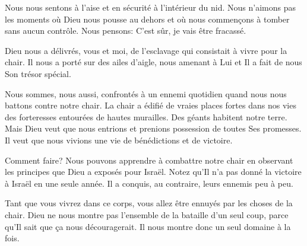 Nous nous sentons à l'aise et en sécurité à l'intérieur du nid.
 Nous n'aimons pas les moments où Dieu nous pousse au dehors
 et où nous commençons à tomber sans aucun contrôle.
 Nous pensons: \og C'est sûr, je vais être fracassé. \fg{}


Dieu nous a délivrés, vous et moi, de l'esclavage
 qui consistait à vivre pour la chair.
 Il nous a porté sur des ailes d'aigle, nous amenant à Lui
 et Il a fait de nous Son trésor spécial. 

\dvrule







 Nous sommes, nous aussi, confrontés à un ennemi quotidien
 quand nous nous battons contre notre chair.
 La chair a édifié de vraies places fortes dans nos vies
 \ocadr{}des forteresses entourées de hautes murailles.
 Des géants habitent notre terre.
 Mais Dieu veut que nous entrions et prenions possession
 de toutes Ses promesses.
 Il veut que nous vivions une vie de bénédictions et de victoire.

Comment faire? Nous pouvons apprendre à combattre notre chair
 en observant les principes que Dieu a exposés pour Israël.
 Notez qu'Il n'a pas donné la victoire à Israël en une seule année.
 Il a conquis, au contraire, leurs ennemis peu à peu.


Tant que vous vivrez dans ce corps,
 vous allez être ennuyés par les choses de la chair.
 Dieu ne nous montre pas l'ensemble de la bataille d'un seul coup,
 parce qu'Il sait que ça nous découragerait.
 Il nous montre donc un seul domaine à la fois.

